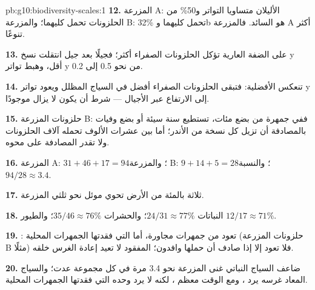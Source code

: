 \begin{solution}{pb:g10:biodiversity-scales:1}
\textbf{12.} المزرعة A: الأليلان متساويا التواتر و50\% من الحلزونات
تحمل كليهما؛ والمزرعة B: 32\% تحمل كليهما وb هو السائد. فالمزرعة A
أكثر تنوعًا.

\textbf{13.} على الضفة العارية تؤكل الحلزونات الصفراء أكثر؛ فجيلًا بعد
جيل انتقلت نسخ y أقل، وهبط تواتر y من نحو 0.5 إلى 0.2.

\textbf{14.} تنعكس الأفضلية: فتبقى الحلزونات الصفراء أفضل في السياج
المظلل ويعود تواتر y إلى الارتفاع عبر الأجيال --- شرط أن يكون 
لا يزال موجودًا.

\textbf{15.} حلزونات المزرعة B: ففي جمهرة من بضع مئات، تستطيع سنة
سيئة أو بضع وفيات بالمصادفة أن تزيل كل نسخة من  الأندر؛ أما بين
عشرات الألوف  تحمله آلاف الحلزونات ولا تقدر المصادفة على
محوه.

\textbf{16.} المزرعة A: $31 + 46 + 17 = 94$؛ والمزرعة B:
$9 + 14 + 5 = 28$؛ والنسبة $94/28 \approx 3.4$.

\textbf{17.} ثلاثة بالمئة من الأرض تحوي موئل نحو ثلثي  المزرعة.

\textbf{18.} النباتات $24/31 \approx 77\%$؛ والحشرات
$35/46 \approx 76\%$؛ والطيور $12/17 \approx 71\%$.

\textbf{19.} :  تعود من جمهرات مجاورة، أما
 التي فقدتها الجمهرات المحلية (حلزونات المزرعة B مثلًا) فلا
تعود إلا إذا صادف أن حملها وافدون؛  المفقود لا تعيد إعادة
الغرس خلقه.

\textbf{20.} ضاعف السياج النباتي غنى  المزرعة نحو 3.4 مرة في كل
مجموعة عدت؛ والسياج المعاد غرسه يرد ، ومع الوقت معظم
، لكنه لا يرد وحده  التي فقدتها الجمهرات المحلية.
\end{solution}
